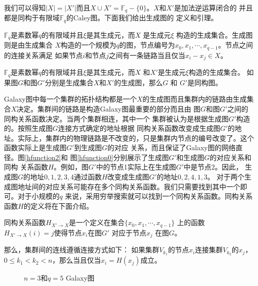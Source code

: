 我们可以得知$|X|=|X'|$而且$X\cup X'=\mathds{F}_q-\{0\}$。$X$和$X'$是加法逆运算闭合的
并且都是同构于有限域$\mathds{F}_q$的Caley图。下面我们给出生成图的
定义和引理。


\begin{definition}
$\mathds{F}_q$是素数幂$q$的有限域并且$\xi$是其生成元，而$X$ 是生成元$\xi$ 构造的生成集合。生成图则是由生成集合
$X$构造的一个规模为$q$的图，节点编号为$x_{0}, x_{1}, \cdots, x_{q-1}$。节点之间的连接关系满足
如果节点$i$和节点$j$之间有一条链路当且仅当$x_{i} -x_{j} \in X$。
\end{definition}

\begin{lemma}\label{thm:generator-graph}
$\mathds{F}_q$是素数幂$q$的有限域并且$\xi$是其生成元，而$X$ 和$X'$是生成元$\xi$构造的生成集合。
 如果图$G$和图$G'$分别是生成集合$X$和$X'$的生成图，那么$G$ 和
$G'$是同构图。
\end{lemma}

Galaxy图中每一个集群的拓扑结构都是一个$X$的生成图而且集群内的链路由生成集
合$X$决定。集群间的链路是构造Galaxy图最重要的部分而且由
图$G$和图$G'$之间的同构关系函数决定。当两个集群相连，其中一个
集群被认为是根据生成图$G'$构造的。按照生成图$G$连接方式确定的地址根据
同构关系函数改变成生成图$G'$的地址。实际上，集群内的物理链路是不改变的，只是集群内节点的编号改变了。这个函数实际上是生成图$G'$到生成图$G$的对应
关系，而且保证了Galaxy图的网络直径。图\ref{hfunction2}和
图\ref{hfunction0}分别展示了生成图$G'$和生成图$G$的对应关系和同构
关系函数$H$。例如，图$G'$中的节点1实际上在生成图$G'$中是节点2。因此，
生成图$G$的地址${0,1,2,3,4}$通过函数$H$改变成生成图$G'$的地址${0,2,4,1,3}$。
对于两个生成图地址间的对应关系可能存在多个同构关系函数。我们只需要找到其中一个即可。对于小规模的$q$
来说，采用穷举搜索就可以找到一个同构关系函数。同构关系函数$H$的定义将在下面介绍。

\begin{definition}
同构关系函数$H_{X' \rightarrow X}$是一个定义在集合$\{x_{0}, x_{1}, \cdots, x_{q-1}\}$
上的函数$H_{X' \rightarrow X}(i) = j$使得节点$x_i$在图$G'$ 对应于节点$x_j$ 在图$G$。
\end{definition}

那么，集群间的连线遵循连接方式如下：
如果集群$V_{k_{1}}$的节点$x_{i}$连接集群$V_{k_{2}}$的$x_{j}$， $0 \le k_{1}<k_{2}< n$，那么当且仅当$x_{i}=H(x_{j})$成立。


\begin{figure}[htp]
  \centering
   \begin{minipage}[t]{\textwidth}
   \centering
  \caption{$n=3$和$q=5$ Galaxy图}
  \label{hfunction}
    \end{minipage}
\end{figure}

